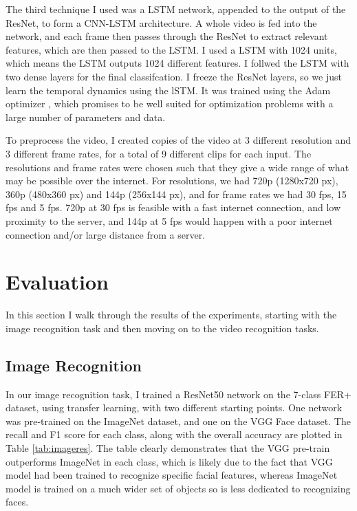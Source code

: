 \documentclass[sigconf]{acmart}
\begin{document}
{The third technique I used was a LSTM network, appended to the output of the
ResNet, to form a CNN-LSTM architecture. 
A whole video is fed into the network, and each frame then passes through the
ResNet to extract relevant features, which are then passed to the LSTM.
I used a LSTM with 1024 units, which
means the LSTM outputs 1024 different features. I follwed the LSTM with two
dense layers for the final classifcation.
I freeze the ResNet layers, so we just learn the temporal dynamics using the
lSTM. It was trained using the Adam
optimizer \cite{kingma2014adam}, which promises to be well suited for
optimization problems with a large number of parameters and data. 

To preprocess the video, I created copies of the video at 3 different
resolution and 3 different frame rates, for a total of 9 different clips for
each input. The resolutions and frame rates were chosen such that they give a
wide range of what may be possible over the internet. For resolutions, we had
720p (1280x720 px), 360p (480x360 px) and 144p (256x144 px), and for
frame rates we had 30 fps, 15 fps and 5 fps. 720p at 30 fps is feasible
with a fast internet connection, and low proximity to the server, and 144p at
5 fps would happen with a poor internet connection and/or large distance from
a server. 

\section{Evaluation}

In this section I walk through the results of the experiments, starting with
the image recognition task and then moving on to the video recognition tasks.

\subsection{Image Recognition}

In our image recognition task, I trained a ResNet50 network on the 7-class FER+
dataset, using transfer learning, with two different starting points. One
network was pre-trained on the ImageNet dataset, and one on the VGG Face
dataset. The recall and F1 score for each class, along with the overall
accuracy are plotted in Table \ref{tab:imageres}. The table clearly
demonstrates that the VGG pre-train outperforms ImageNet in each class, which
is likely due to the fact that VGG model had been trained to recognize specific facial
features, whereas ImageNet model is trained on a much wider set of objects so is
less dedicated to recognizing faces.

}
\end{document}
